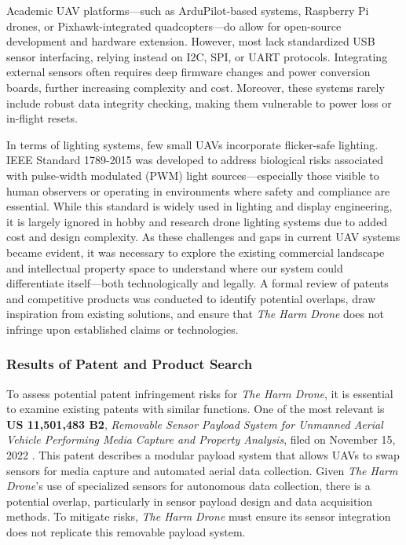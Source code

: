 \documentclass[12pt]{article}
\begin{document}
Academic UAV platforms—such as ArduPilot-based systems, Raspberry Pi drones, or Pixhawk-integrated quadcopters—do allow for open-source development and hardware extension. However, most lack standardized USB sensor interfacing, relying instead on I2C, SPI, or UART protocols. Integrating external sensors often requires deep firmware changes and power conversion boards, further increasing complexity and cost. Moreover, these systems rarely include robust data integrity checking, making them vulnerable to power loss or in-flight resets.

In terms of lighting systems, few small UAVs incorporate flicker-safe lighting. IEEE Standard 1789-2015 was developed to address biological risks associated with pulse-width modulated (PWM) light sources—especially those visible to human observers or operating in environments where safety and compliance are essential. While this standard is widely used in lighting and display engineering, it is largely ignored in hobby and research drone lighting systems due to added cost and design complexity.
As these challenges and gaps in current UAV systems became evident, it was necessary to explore the existing commercial landscape and intellectual property space to understand where our system could differentiate itself—both technologically and legally. A formal review of patents and competitive products was conducted to identify potential overlaps, draw inspiration from existing solutions, and ensure that \textit{The Harm Drone} does not infringe upon established claims or technologies.

\subsubsection{Results of Patent and Product Search}

To assess potential patent infringement risks for \textit{The Harm Drone}, it is essential to examine existing patents with similar functions. One of the most relevant is \textbf{US 11,501,483 B2}, \textit{Removable Sensor Payload System for Unmanned Aerial Vehicle Performing Media Capture and Property Analysis}, filed on November 15, 2022 \cite{patent1}. This patent describes a modular payload system that allows UAVs to swap sensors for media capture and automated aerial data collection. Given \textit{The Harm Drone}’s use of specialized sensors for autonomous data collection, there is a potential overlap, particularly in sensor payload design and data acquisition methods. To mitigate risks, \textit{The Harm Drone} must ensure its sensor integration does not replicate this removable payload system.
\end{document}
